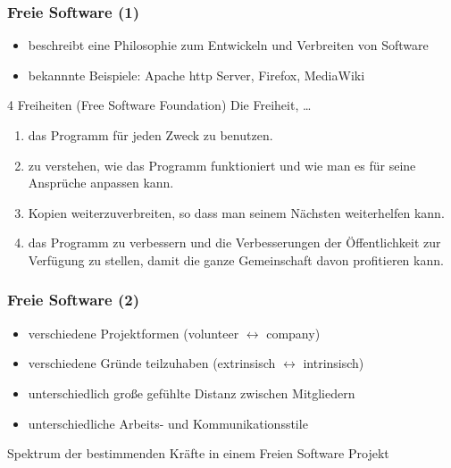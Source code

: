 \documentclass{beamer}
\begin{document}
\begin{frame}
\frametitle{Freie Software (1)}
\begin{itemize}
 \item beschreibt eine Philosophie zum Entwickeln und Verbreiten von Software
 \item bekannnte Beispiele: Apache http Server, Firefox, MediaWiki
\end{itemize}

\begin{block}{4 Freiheiten (Free Software Foundation)}
    Die Freiheit, \dots
    \begin{enumerate}
      \item das Programm für jeden Zweck zu benutzen.
      \item zu verstehen, wie das Programm funktioniert und wie man es für seine Ansprüche anpassen kann.
      \item Kopien weiterzuverbreiten, so dass man seinem Nächsten weiterhelfen kann.
      \item das Programm zu verbessern und die Verbesserungen der Öffentlichkeit zur Verfügung zu stellen, damit die ganze Gemeinschaft davon profitieren kann.
    \end{enumerate}
\end{block}
\end{frame}

\begin{frame}
\frametitle{Freie Software (2)}
\begin{itemize}
 \item verschiedene Projektformen (volunteer $\leftrightarrow$ company)
 \item verschiedene Gr\"unde teilzuhaben (extrinsisch $\leftrightarrow$ intrinsisch)
 \item unterschiedlich gro\ss e gef\"uhlte Distanz zwischen Mitgliedern
 \item unterschiedliche Arbeits- und Kommunikationsstile
\end{itemize}

\begin{block}{Spektrum der bestimmenden Kr\"afte in einem Freien Software Projekt}
\begin{figure}[h]
	\centering
\end{figure}
\end{block}
\end{frame}
\end{document}
